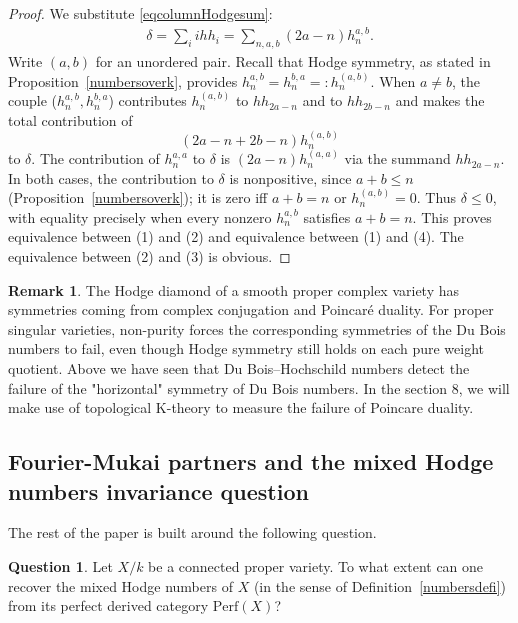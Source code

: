 \documentclass{amsart}
\theoremstyle{plain}
\theoremstyle{definition}
\newtheorem{ques}[prop]{Question}
\newtheorem{remark}[prop]{Remark}
\newcommand{\Perf}{\mathrm{Perf}}
\begin{document}
\begin{proof}

We substitute \eqref{eqcolumnHodgesum}:
\[
\begin{split}
\delta = \sum_i ihh_i =\sum_{n,a,b}(2a-n)h_n^{a,b}.\end{split}
\]
Write $(a,b)$ for an unordered pair. Recall that Hodge symmetry, as stated in Proposition~\ref{numbersoverk}, provides $h^{a,b}_n=h^{b,a}_n=:h^{(a,b)}_n$. When $a\ne b$, the couple ($h^{a,b}_n,h^{b,a}_n$) contributes $h^{(a,b)}_n$ to $hh_{2a-n}$ and to $hh_{2b-n}$ and makes the total contribution of
\[(2a-n+2b-n)h^{(a,b)}_n \]
to $\delta$. The contribution of $h^{a,a}_n$ to $\delta$ is $(2a-n)h^{(a,a)}_n$ via the summand $hh_{2a-n}$. In both cases, the contribution to $\delta$ is nonpositive, since $a+b\le n$ (Proposition~\ref{numbersoverk}); it is zero iff $a+b=n$ or $h^{(a,b)}_n=0$. Thus $\delta\leq0$, with equality precisely when every nonzero $h_n^{a,b}$ satisfies $a+b=n$. This proves equivalence between (1) and (2) and  equivalence between (1) and (4). The equivalence between (2) and (3) is obvious.
\end{proof}

\begin{remark}
The Hodge diamond of a smooth proper complex variety has symmetries coming from complex conjugation and Poincar\'e duality. For proper singular varieties, non-purity forces the corresponding symmetries of the Du Bois numbers to fail, even though Hodge symmetry still holds on each pure weight quotient.
Above we have seen that Du Bois--Hochschild numbers detect the failure of the "horizontal" symmetry of Du Bois numbers.
In the section 8, we will make use of topological K-theory to measure the failure of Poincare duality.
\end{remark}

\subsection{Fourier-Mukai partners and the mixed Hodge numbers invariance question}

The rest of the paper is built around the following question.

\begin{ques}\label{Hodgerecoveryquestion}
Let $X/k$ be a connected proper variety. To what extent can one recover the mixed Hodge numbers of $X$ (in the sense of Definition~\ref{numbersdefi}) from its perfect derived category $\Perf(X)$?
\end{ques}
\end{document}
